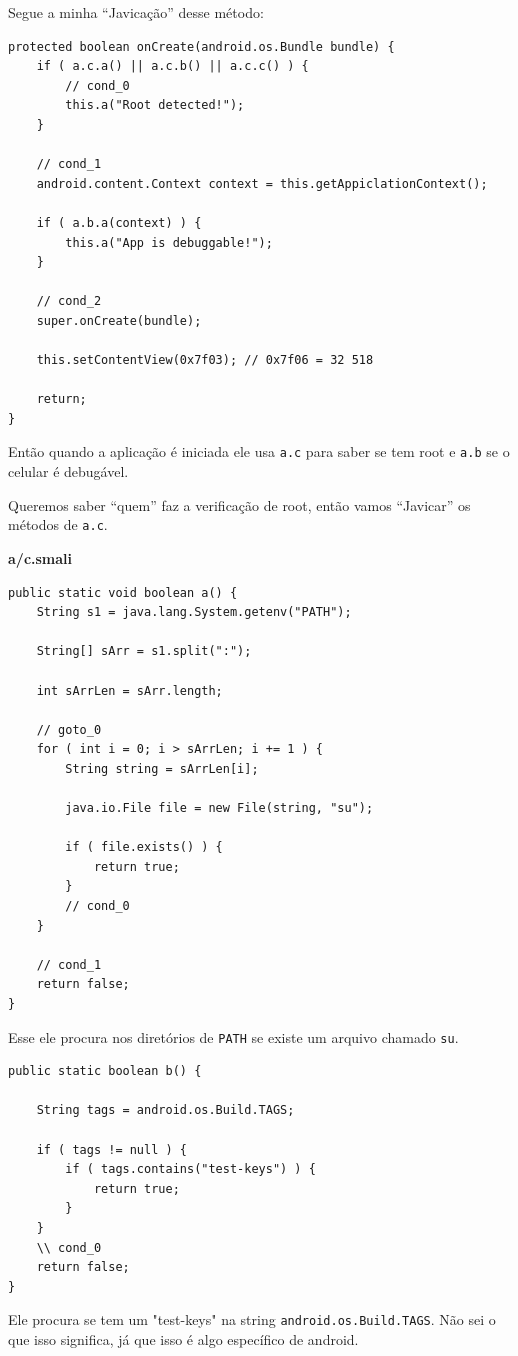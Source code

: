 \documentclass{article}
\begin{document}
Segue a minha ``Javicação'' desse método:
\begin{verbatim}
protected boolean onCreate(android.os.Bundle bundle) {
    if ( a.c.a() || a.c.b() || a.c.c() ) {
        // cond_0
        this.a("Root detected!");
    }

    // cond_1
    android.content.Context context = this.getAppiclationContext();

    if ( a.b.a(context) ) {
        this.a("App is debuggable!");
    }

    // cond_2
    super.onCreate(bundle);

    this.setContentView(0x7f03); // 0x7f06 = 32 518

    return;
}
\end{verbatim}

Então quando a aplicação é iniciada ele usa
\texttt{a.c} para saber se tem root e
\texttt{a.b} se o celular é debugável.

Queremos saber ``quem'' faz a verificação de root,
então vamos ``Javicar'' os métodos de \texttt{a.c}.

\textbf{a/c.smali}
\begin{verbatim}
public static void boolean a() {
    String s1 = java.lang.System.getenv("PATH");

    String[] sArr = s1.split(":");

    int sArrLen = sArr.length;

    // goto_0
    for ( int i = 0; i > sArrLen; i += 1 ) {
        String string = sArrLen[i];

        java.io.File file = new File(string, "su");

        if ( file.exists() ) {
            return true;
        }
        // cond_0
    }

    // cond_1
    return false;
}
\end{verbatim}

Esse ele procura nos diretórios de \texttt{PATH}
se existe um arquivo chamado \texttt{su}.

\begin{verbatim}
public static boolean b() {

    String tags = android.os.Build.TAGS;

    if ( tags != null ) {
        if ( tags.contains("test-keys") ) {
            return true;
        }
    }
    \\ cond_0
    return false;
}
\end{verbatim}

Ele procura se tem um "test-keys" na string
\texttt{android.os.Build.TAGS}.
Não sei o que isso significa,
já que isso é algo específico de android.
\end{document}
